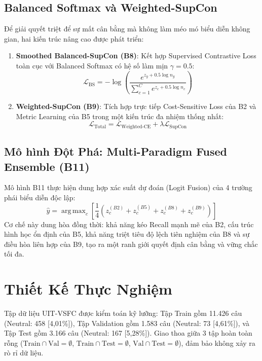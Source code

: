 \documentclass[10pt,journal,compsoc]{IEEEtran}
\DeclareMathOperator*{\argmax}{arg\,max}
\begin{document}
\subsection{Balanced Softmax và Weighted-SupCon}
Để giải quyết triệt để sự mất cân bằng mà không làm méo mó biểu diễn không gian, hai kiến trúc nâng cao được phát triển:
\begin{enumerate}
    \item \textbf{Smoothed Balanced-SupCon (B8)}: Kết hợp Supervised Contrastive Loss toàn cục với Balanced Softmax có hệ số làm mịn $\gamma = 0.5$:
    \begin{equation}
    \mathcal{L}_{\text{BS}} = -\log \left( \frac{e^{z_y + 0.5 \log n_y}}{\sum_{c=1}^C e^{z_c + 0.5 \log n_c}} \right)
    \end{equation}
    \item \textbf{Weighted-SupCon (B9)}: Tích hợp trực tiếp Cost-Sensitive Loss của B2 và Metric Learning của B5 trong một kiến trúc đa nhiệm thống nhất:
    \begin{equation}
    \mathcal{L}_{\text{Total}} = \mathcal{L}_{\text{Weighted-CE}} + \lambda \mathcal{L}_{\text{SupCon}}
    \end{equation}
\end{enumerate}

\subsection{Mô hình Đột Phá: Multi-Paradigm Fused Ensemble (B11)}
Mô hình B11 thực hiện dung hợp xác suất dự đoán (Logit Fusion) của 4 trường phái biểu diễn độc lập:
\begin{equation}
\hat{y} = \argmax_c \left[ \frac{1}{4} \left( z_c^{(B2)} + z_c^{(B5)} + z_c^{(B8)} + z_c^{(B9)} \right) \right]
\end{equation}
Cơ chế này dung hòa đồng thời: khả năng kéo Recall mạnh mẽ của B2, cấu trúc hình học ổn định của B5, khả năng triệt tiêu độ lệch tiên nghiệm của B8 và sự điều hòa liên hợp của B9, tạo ra một ranh giới quyết định cân bằng và vững chắc tối đa.

\section{Thiết Kế Thực Nghiệm}
Tập dữ liệu UIT-VSFC được kiểm toán kỹ lưỡng: Tập Train gồm 11.426 câu (Neutral: 458 [4,01\%]), Tập Validation gồm 1.583 câu (Neutral: 73 [4,61\%]), và Tập Test gồm 3.166 câu (Neutral: 167 [5,28\%]). Giao thoa giữa 3 tập hoàn toàn rỗng ($\text{Train} \cap \text{Val} = \emptyset$, $\text{Train} \cap \text{Test} = \emptyset$, $\text{Val} \cap \text{Test} = \emptyset$), đảm bảo không xảy ra rò rỉ dữ liệu.
\end{document}
